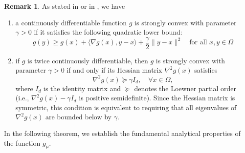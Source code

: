 \documentclass[11pt]{article}
\theoremstyle{definition}
\newtheorem{remark}[theorem]{Remark}
\newcommand{\1}{\mathbf{1}}
\begin{document}
\begin{remark}\label{stronglyconvex}
As stated in \cite[p. 459]{boyd2004convex} or in \cite[Definition 2.1.2 and Theorem 2.1.11]{nesterov2018lectures}, we have
\begin{enumerate}
    \item[{\rm(a)}] a continuously differentiable function $g$ is strongly convex with parameter $\gamma > 0$ if it satisfies the following quadratic lower bound:
\begin{equation*}
g(y) \ge g(x) + \langle \nabla g(x), y - x \rangle + \frac{\gamma}{2} \|y - x\|^2\quad \text{for all }x, y \in \Omega
\end{equation*}
 \item[{\rm(b)}] if $g$ is twice continuously differentiable, then $g$
is strongly convex with parameter $\gamma > 0$ 
 if and only if its Hessian matrix $\nabla^2 g(x)$ satisfies
\begin{equation*}
\nabla^2 g(x) \succeq \gamma I_d, \quad \forall x \in \Omega,
\end{equation*}
where $I_d$ is the identity matrix and $\succeq$ denotes the Loewner partial order (i.e., $\nabla^2 g(x) - \gamma I_d$ is positive semidefinite). Since the Hessian matrix is symmetric, this condition is equivalent to requiring that all eigenvalues of  $\nabla^2 g(x)$ are bounded below by $\gamma$.
 \end{enumerate}
\end{remark}


In the following theorem, we establish the fundamental analytical properties of the function $g_\mu$. 
\end{document}
